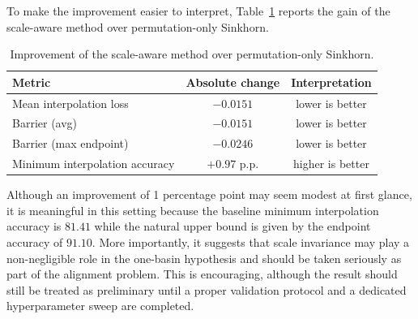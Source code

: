 \documentclass[11pt,a4paper]{article}
\begin{document}
\begin{table}[h]
    \centering
    \caption{Current results on VGG11 / CIFAR-10. Lower is better for loss-based metrics; higher is better for accuracy.}
    \label{tab:main-results}
\end{table}

To make the improvement easier to interpret, Table~\ref{tab:improvements} reports the gain of the scale-aware method over permutation-only Sinkhorn.

\begin{table}[h]
    \centering
    \caption{Improvement of the scale-aware method over permutation-only Sinkhorn.}
    \label{tab:improvements}
    \begin{tabular}{lcc}
        \toprule
        Metric & Absolute change & Interpretation \\
        \midrule
        Mean interpolation loss & \(-0.0151\) & lower is better \\
        Barrier (avg) & \(-0.0151\) & lower is better \\
        Barrier (max endpoint) & \(-0.0246\) & lower is better \\
        Minimum interpolation accuracy & \(+0.97\) p.p. & higher is better \\
        \bottomrule
    \end{tabular}
\end{table}

Although an improvement of 1 percentage point may seem modest at first glance, it is meaningful in this setting because the baseline minimum interpolation accuracy is \(81.41\) while the natural upper bound is given by the endpoint accuracy of \(91.10\). More importantly, it suggests that scale invariance may play a non-negligible role in the one-basin hypothesis and should be taken seriously as part of the alignment problem. This is encouraging, although the result should still be treated as preliminary until a proper validation protocol and a dedicated hyperparameter sweep are completed.
\end{document}

